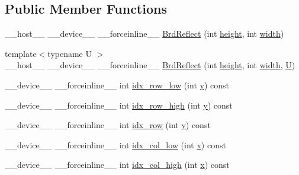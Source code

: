 \subsection*{Public Member Functions}
\begin{DoxyCompactItemize}
\item 
\-\_\-\-\_\-host\-\_\-\-\_\- \-\_\-\-\_\-device\-\_\-\-\_\- \-\_\-\-\_\-forceinline\-\_\-\-\_\- \hyperlink{structcv_1_1gpu_1_1device_1_1BrdReflect_a419032ce8f96bd5a321dde078021b19b}{Brd\-Reflect} (int \hyperlink{highgui__c_8h_adc7b4b8a6ef510e136071efbc9cd9a58}{height}, int \hyperlink{highgui__c_8h_a2474a5474cbff19523a51eb1de01cda4}{width})
\item 
{\footnotesize template$<$typename U $>$ }\\\-\_\-\-\_\-host\-\_\-\-\_\- \-\_\-\-\_\-device\-\_\-\-\_\- \-\_\-\-\_\-forceinline\-\_\-\-\_\- \hyperlink{structcv_1_1gpu_1_1device_1_1BrdReflect_a7c25676eeaedfdeb2ee7e5577a75a80f}{Brd\-Reflect} (int \hyperlink{highgui__c_8h_adc7b4b8a6ef510e136071efbc9cd9a58}{height}, int \hyperlink{highgui__c_8h_a2474a5474cbff19523a51eb1de01cda4}{width}, \hyperlink{core__c_8h_aa9c521f41af9a5191e5e4b6ffbae211a}{U})
\item 
\-\_\-\-\_\-device\-\_\-\-\_\- \-\_\-\-\_\-forceinline\-\_\-\-\_\- int \hyperlink{structcv_1_1gpu_1_1device_1_1BrdReflect_ab29583a8857509e4b7696febb527d035}{idx\-\_\-row\-\_\-low} (int \hyperlink{highgui__c_8h_af1202c02b14870c18fb3a1da73e9e7c7}{y}) const 
\item 
\-\_\-\-\_\-device\-\_\-\-\_\- \-\_\-\-\_\-forceinline\-\_\-\-\_\- int \hyperlink{structcv_1_1gpu_1_1device_1_1BrdReflect_af0f7d3e0f6597d112e7144d47e62241a}{idx\-\_\-row\-\_\-high} (int \hyperlink{highgui__c_8h_af1202c02b14870c18fb3a1da73e9e7c7}{y}) const 
\item 
\-\_\-\-\_\-device\-\_\-\-\_\- \-\_\-\-\_\-forceinline\-\_\-\-\_\- int \hyperlink{structcv_1_1gpu_1_1device_1_1BrdReflect_abf12580e039b1100d23c818b88a37e82}{idx\-\_\-row} (int \hyperlink{highgui__c_8h_af1202c02b14870c18fb3a1da73e9e7c7}{y}) const 
\item 
\-\_\-\-\_\-device\-\_\-\-\_\- \-\_\-\-\_\-forceinline\-\_\-\-\_\- int \hyperlink{structcv_1_1gpu_1_1device_1_1BrdReflect_a5ae64b16615e12e9211bdd9a4262026c}{idx\-\_\-col\-\_\-low} (int \hyperlink{highgui__c_8h_a6150e0515f7202e2fb518f7206ed97dc}{x}) const 
\item 
\-\_\-\-\_\-device\-\_\-\-\_\- \-\_\-\-\_\-forceinline\-\_\-\-\_\- int \hyperlink{structcv_1_1gpu_1_1device_1_1BrdReflect_aa9067a1a7681292116378ddf0edcdc47}{idx\-\_\-col\-\_\-high} (int \hyperlink{highgui__c_8h_a6150e0515f7202e2fb518f7206ed97dc}{x}) const 

\end{DoxyCompactItemize}
